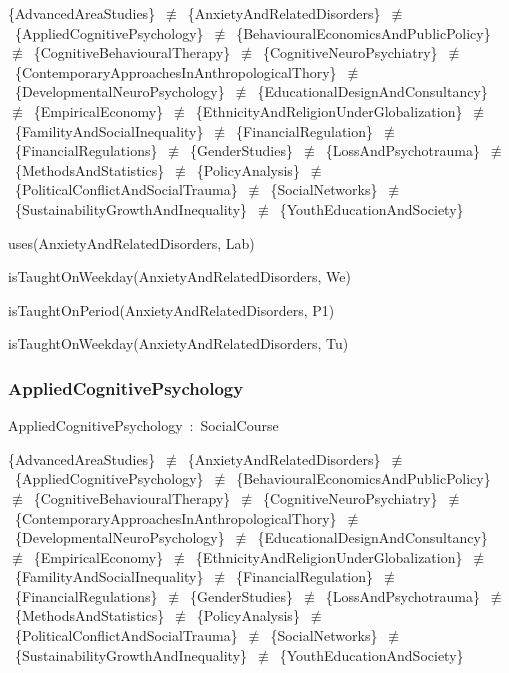 \documentclass{article}
\begin{document}
\{AdvancedAreaStudies\}~\ensuremath{\not\equiv}~\{AnxietyAndRelatedDisorders\}~\ensuremath{\not\equiv}~\{AppliedCognitivePsychology\}~\ensuremath{\not\equiv}~\{BehaviouralEconomicsAndPublicPolicy\}~\ensuremath{\not\equiv}~\{CognitiveBehaviouralTherapy\}~\ensuremath{\not\equiv}~\{CognitiveNeuroPsychiatry\}~\ensuremath{\not\equiv}~\{ContemporaryApproachesInAnthropologicalThory\}~\ensuremath{\not\equiv}~\{DevelopmentalNeuroPsychology\}~\ensuremath{\not\equiv}~\{EducationalDesignAndConsultancy\}~\ensuremath{\not\equiv}~\{EmpiricalEconomy\}~\ensuremath{\not\equiv}~\{EthnicityAndReligionUnderGlobalization\}~\ensuremath{\not\equiv}~\{FamilityAndSocialInequality\}~\ensuremath{\not\equiv}~\{FinancialRegulation\}~\ensuremath{\not\equiv}~\{FinancialRegulations\}~\ensuremath{\not\equiv}~\{GenderStudies\}~\ensuremath{\not\equiv}~\{LossAndPsychotrauma\}~\ensuremath{\not\equiv}~\{MethodsAndStatistics\}~\ensuremath{\not\equiv}~\{PolicyAnalysis\}~\ensuremath{\not\equiv}~\{PoliticalConflictAndSocialTrauma\}~\ensuremath{\not\equiv}~\{SocialNetworks\}~\ensuremath{\not\equiv}~\{SustainabilityGrowthAndInequality\}~\ensuremath{\not\equiv}~\{YouthEducationAndSociety\}

uses(AnxietyAndRelatedDisorders, Lab)

isTaughtOnWeekday(AnxietyAndRelatedDisorders, We)

isTaughtOnPeriod(AnxietyAndRelatedDisorders, P1)

isTaughtOnWeekday(AnxietyAndRelatedDisorders, Tu)

\subsubsection*{AppliedCognitivePsychology}

AppliedCognitivePsychology~:~SocialCourse

\{AdvancedAreaStudies\}~\ensuremath{\not\equiv}~\{AnxietyAndRelatedDisorders\}~\ensuremath{\not\equiv}~\{AppliedCognitivePsychology\}~\ensuremath{\not\equiv}~\{BehaviouralEconomicsAndPublicPolicy\}~\ensuremath{\not\equiv}~\{CognitiveBehaviouralTherapy\}~\ensuremath{\not\equiv}~\{CognitiveNeuroPsychiatry\}~\ensuremath{\not\equiv}~\{ContemporaryApproachesInAnthropologicalThory\}~\ensuremath{\not\equiv}~\{DevelopmentalNeuroPsychology\}~\ensuremath{\not\equiv}~\{EducationalDesignAndConsultancy\}~\ensuremath{\not\equiv}~\{EmpiricalEconomy\}~\ensuremath{\not\equiv}~\{EthnicityAndReligionUnderGlobalization\}~\ensuremath{\not\equiv}~\{FamilityAndSocialInequality\}~\ensuremath{\not\equiv}~\{FinancialRegulation\}~\ensuremath{\not\equiv}~\{FinancialRegulations\}~\ensuremath{\not\equiv}~\{GenderStudies\}~\ensuremath{\not\equiv}~\{LossAndPsychotrauma\}~\ensuremath{\not\equiv}~\{MethodsAndStatistics\}~\ensuremath{\not\equiv}~\{PolicyAnalysis\}~\ensuremath{\not\equiv}~\{PoliticalConflictAndSocialTrauma\}~\ensuremath{\not\equiv}~\{SocialNetworks\}~\ensuremath{\not\equiv}~\{SustainabilityGrowthAndInequality\}~\ensuremath{\not\equiv}~\{YouthEducationAndSociety\}
\end{document}
